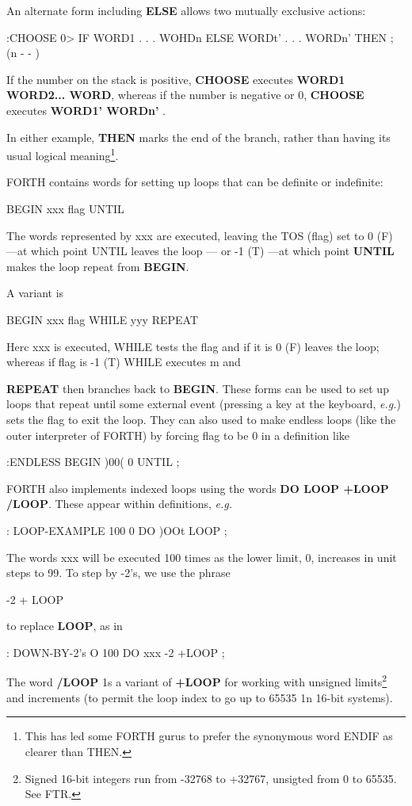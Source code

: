 \begin{itemize}
An alternate form including \textbf{ELSE} allows two mutually exclusive actions:

:CHOOSE 0> IF WORD1 . . . WOHDn
ELSE WORDt' . . . WORDn'
THEN ; (n - - )

If the number on the stack is positive, \textbf{CHOOSE} executes \textbf{WORD1 WORD2... WORD}, whereas if the number is negative or 0, \textbf{CHOOSE} executes \textbf{WORD1' WORDn'} .

In either example, \textbf{THEN} marks the end of the branch, rather than having its usual logical meaning\footnote{This has led some FORTH gurus to prefer the synonymous word ENDIF as clearer than THEN.}.


FORTH contains words for setting up loops that can be deﬁnite or indeﬁnite:

BEGIN xxx ﬂag UNTIL

The words represented by xxx are executed, leaving the TOS (ﬂag) set to 0 (F) —at which point UNTIL leaves the loop — or -1 (T) —at which point \textbf{UNTIL} makes the loop repeat from \textbf{BEGIN}.

A variant is

BEGIN xxx ﬂag WHILE yyy REPEAT

Herc xxx is executed, WHILE tests the ﬂag and if it is 0 (F) leaves
the loop; whereas if flag is -1 (T) WHILE executes m and

\textbf{REPEAT} then branches back to \textbf{BEGIN}. These forms can be used to set up loops that repeat until some external event (pressing a key at the keyboard, \textit{e.g.}) sets the ﬂag to exit the loop. They can also used to make endless loops (like the outer interpreter of FORTH) by forcing flag to be 0 in a deﬁnition like

:ENDLESS BEGIN )00( 0 UNTIL ;

FORTH also implements indexed loops using the words \textbf{DO LOOP +LOOP /LOOP}. These appear within deﬁnitions, \textit{e.g.}

: LOOP-EXAMPLE 100 0 DO )OOt LOOP ;

The words xxx will be executed 100 times as the lower limit, 0, increases in unit steps to 99. To step by -2's, we use the phrase

-2 + LOOP

to replace \textbf{LOOP}, as in

: DOWN-BY-2's O 100 DO xxx -2 +LOOP ;

The word \textbf{/LOOP} 1s a variant of \textbf{+LOOP} for working with unsigned limits\footnote{Signed 16-bit integers run from -32768 to +32767, unsigted from 0 to 65535. See FTR.} and increments (to permit the loop index to go up to 65535 1n 16-bit systems).


\end{itemize}
